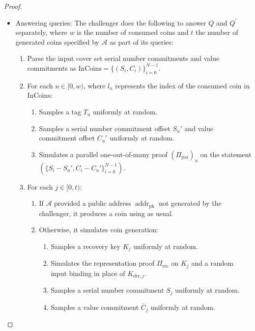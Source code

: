 \documentclass{llncs}
\newcommand{\addr}{\operatorname{addr}}
\newcommand{\com}{\operatorname{Com}}
\begin{document}
\begin{proof}
\begin{itemize}
\begin{enumerate}
\begin{enumerate}
        \end{enumerate}
        \item Simulates the balance proof $\Pi_{\text{bal}}$ on the statement $(C - \com(v,0))$.
        \item Assembles the transaction and adds it to the ledger as appropriate.
    \end{enumerate}
    \item Answering  queries: The challenger does the following to answer $Q$ and $Q^\prime$ separately, where $w$ is the number of consumed coins and $t$ the number of generated coins specified by $\mathcal{A}$ as part of its queries:
    \begin{enumerate}
        \item Parse the input cover set serial number commitments and value commitments as $\text{InCoins} = \{(S_i, C_i)\}_{i=0}^{N-1}$.
        \item For each $u \in [0,w)$, where $l_u$ represents the index of the consumed coin in $\text{InCoins}$:
        \begin{enumerate}
            \item Samples a tag $T_u$ uniformly at random.
            \item Samples a serial number commitment offset $S_u'$ and value commitment offset $C_u'$ uniformly at random.
            \item Simulates a parallel one-out-of-many proof $(\Pi_{\text{par}})_u$ on the statement $(\{S_i - S_u', C_i - C_u'\}_{i=0}^{N-1})$.
        \end{enumerate}
        \item For each $j \in [0,t)$:
        \begin{enumerate}
            \item If $\mathcal{A}$ provided a public address $\addr_{\text{pk}}$ not generated by the challenger, it produces a coin using  as usual.
            \item Otherwise, it simulates coin generation:
            \begin{enumerate}
                \item Samples a recovery key $K_j$ uniformly at random.
                \item Simulates the representation proof $\Pi_{\text{rec}}$ on $K_j$ and a random input binding in place of $K_{\text{der},j}$.
                \item Samples a serial number commitment $S_j$ uniformly at random.
                \item Samples a value commitment $\overline{C}_j$ uniformly at random.

\end{enumerate}
\end{enumerate}
\end{enumerate}
\end{itemize}
\end{proof}
\end{document}
